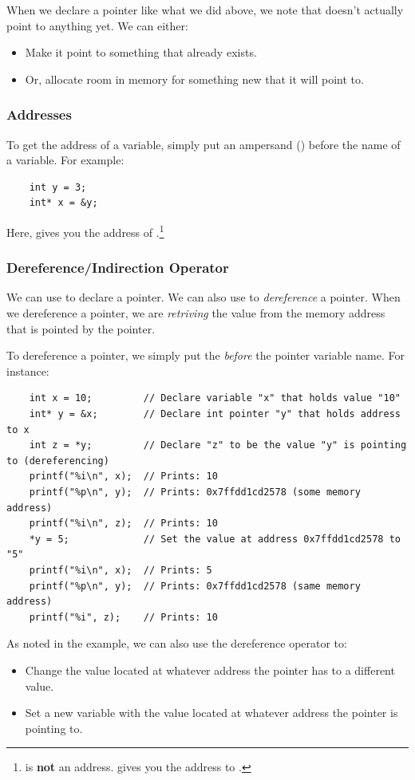 \documentclass[letterpaper]{article}
\begin{document}
\bigskip 

When we declare a pointer like what we did above, we note that  doesn't actually point to anything yet. We can either:
\begin{itemize}
    \item Make it point to something that already exists. 
    \item Or, allocate room in memory for something new that it will point to. 
\end{itemize}

\subsubsection{Addresses}
To get the address of a variable, simply put an ampersand (\code{\&}) before the name of a variable. For example:
\begin{verbatim}
    int y = 3;
    int* x = &y; 
\end{verbatim}
Here,  gives you the address of .\footnote{ is \textbf{not} an address.  gives you the address to .}

\subsubsection{Dereference/Indirection Operator}
We can use \code{*} to declare a pointer. We can also use \code{*} to \emph{dereference} a pointer. When we dereference a pointer, we are \emph{retriving} the value from the memory address that is pointed by the pointer. 

\bigskip 

To dereference a pointer, we simply put the \code{*} \emph{before} the pointer variable name. For instance:
\begin{verbatim}
    int x = 10;         // Declare variable "x" that holds value "10"
    int* y = &x;        // Declare int pointer "y" that holds address to x
    int z = *y;         // Declare "z" to be the value "y" is pointing to (dereferencing)
    printf("%i\n", x);  // Prints: 10
    printf("%p\n", y);  // Prints: 0x7ffdd1cd2578 (some memory address)
    printf("%i\n", z);  // Prints: 10
    *y = 5;             // Set the value at address 0x7ffdd1cd2578 to "5"
    printf("%i\n", x);  // Prints: 5
    printf("%p\n", y);  // Prints: 0x7ffdd1cd2578 (same memory address)
    printf("%i", z);    // Prints: 10
\end{verbatim}
As noted in the example, we can also use the dereference operator to:
\begin{itemize}
    \item Change the value located at whatever address the pointer has to a different value.
    \item Set a new variable with the value located at whatever address the pointer is pointing to. 
\end{itemize}
\end{document}
